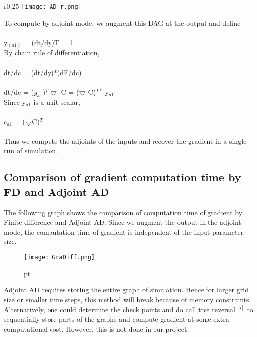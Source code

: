 \documentclass[10pt,a4paper]{report}
\begin{document}
\begin{wrapfigure}{r}{0.25\textwidth} %
    \centering
    \texttt{[image: AD\_r.png]}
    \caption{}
    \label{AD_r}
\end{wrapfigure}

To compute by adjoint mode, we augment this DAG at the output and define\\
\\
y$_{(a1)}$ = (dt/dy)T = 1\\

By chain rule of differentiation,\\
\\
dt/dc = (dt/dy)*(dF/dc)\\
\\
dt/dc = ($y_{a1}$)$^{T} \bigtriangledown $ C = ($\bigtriangledown$ C)$^{T*}$ y$_{a1}$\\ 

Since y$_{a1}$ is a unit scalar,\\
\\
c$_{a1}$  = ($\bigtriangledown$C)$^T$\\
\\
Thus we compute the adjoints of the inputs and recover the gradient in  a single run of simulation.


\subsection{Comparison of gradient computation time by FD and Adjoint AD}
The following graph shows the comparison of computation time of gradient by Finite difference and Adjoint AD. Since we augment the output in the adjoint mode, the computation time of gradient is independent of the input parameter size.\\
\begin{figure}[H]
\begin{center}
\texttt{[image: GraDiff.png]} 
\caption{}  pt
\label{fig:GradDiff}
\end{center}
\end{figure}

Adjoint AD requires storing the entire graph of simulation. Hence for larger grid size or smaller time steps, this method will break because of memory constraints. Alternatively, one could determine the check points and do call tree reversal$^{[5]}$ to sequentially store parts of the graphs and compute gradient at some extra computational cost. However, this is not done in our project.
\end{document}
